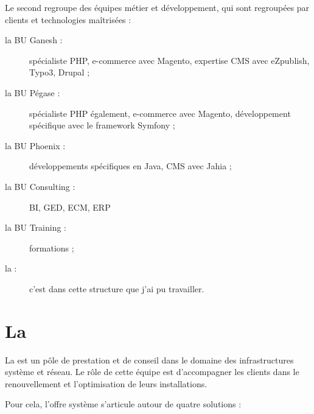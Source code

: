 Le second regroupe des équipes métier et développement, qui sont regroupées par clients et technologies maîtrisées :

\begin{description}
	\item[la BU Ganesh :] spécialiste PHP, e-commerce avec Magento, expertise CMS avec eZpublish, Typo3, Drupal ;
	\item[la BU Pégase :] spécialiste PHP également, e-commerce avec Magento, développement spécifique avec le framework Symfony ;
	\item[la BU Phoenix :] développements spécifiques en Java, CMS avec Jahia ;
	\item[la BU Consulting :] BI, GED, ECM, ERP
	\item[la BU Training :] formations ;
	\item[la \abusys{} :] c'est dans cette structure que j'ai pu travailler.
\end{description}


\section{La \abusys{}}

La \abusys{} est un pôle de prestation et de conseil dans le domaine des infrastructures système et réseau.
Le rôle de cette équipe est d'accompagner les clients dans le renouvellement et l'optimisation de leurs installations.

Pour cela, l'offre système s'articule autour de quatre solutions :

